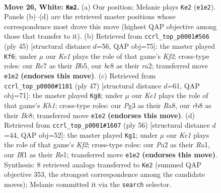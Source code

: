 \documentclass[11pt]{article}
\begin{document}
\clearpage

\begin{figure}[p]\centering
\begin{subfigure}{0.46\textwidth}\centering
\resizebox{\linewidth}{!}{%
\newchessgame
\chessboard[
  setfen={1rb2r2/p1Rp1pk1/8/4p2p/8/5nP1/PP3P1P/2B1KB1R w - - 0 26},
  showmover=false,
  pgfstyle=straightmove, color=movearrow, markmove={e1-e2}
]}
\caption{}
\end{subfigure}\hfill
\begin{subfigure}{0.46\textwidth}\centering
\resizebox{\linewidth}{!}{%
\newchessgame
\chessboard[
  setfen={2r2b1r/5kpp/p3p3/1b2N3/4P3/6P1/RPP1BKP1/7R b - - 0 23},
  showmover=false,
  pgfstyle=straightmove, color=movearrow, markmove={f7-f6}
]}
\caption{}
\end{subfigure}
\\[4pt]
\begin{subfigure}{0.46\textwidth}\centering
\resizebox{\linewidth}{!}{%
\newchessgame
\chessboard[
  setfen={r1b2r1k/5Npp/2p2b2/1p6/p1B5/2P5/PP3PPP/R3R1K1 b - - 7 24},
  showmover=false,
  pgfstyle=straightmove, color=movearrow, markmove={h8-g8}
]}
\caption{}
\end{subfigure}\hfill
\begin{subfigure}{0.46\textwidth}\centering
\resizebox{\linewidth}{!}{%
\newchessgame
\chessboard[
  setfen={5b1r/2N2k2/1p2pp2/2p2r2/8/2P3nP/PP3KP1/R1B1R3 w - - 9 29},
  showmover=false,
  pgfstyle=straightmove, color=movearrow, markmove={f2-g1}
]}
\caption{}
\end{subfigure}
\caption{\textbf{Move 26, White: \texttt{Ke2}.} (a) Our position; Melanie plays \texttt{Ke2} (\texttt{e1e2}). Panels (b)--(d) are the retrieved master positions whose correspondence most drove this move (highest QAP objective among those that transfer to it). (b) Retrieved from \texttt{ccrl\_top\_p0001\#566} (ply 45) [structural distance $d$=56, QAP obj=75]: the master played \texttt{Kf6}; under $\mu$ our \emph{Ke1} plays the role of that game's \emph{Kf2}; cross-type roles: our \emph{R}c7 as their \emph{B}b5, our \emph{b}c8 as their \emph{r}a2; transferred move \texttt{e1e2} \textbf{(endorses this move)}. (c) Retrieved from \texttt{ccrl\_top\_p0000\#1101} (ply 47) [structural distance $d$=61, QAP obj=71]: the master played \texttt{Kg8}; under $\mu$ our \emph{Ke1} plays the role of that game's \emph{Kh1}; cross-type roles: our \emph{P}g3 as their \emph{R}a8, our \emph{r}b8 as their \emph{B}c8; transferred move \texttt{e1e2} \textbf{(endorses this move)}. (d) Retrieved from \texttt{ccrl\_top\_p0001\#1607} (ply 56) [structural distance $d$=44, QAP obj=52]: the master played \texttt{Kg1}; under $\mu$ our \emph{Ke1} plays the role of that game's \emph{Kf2}; cross-type roles: our \emph{P}a2 as their \emph{R}a1, our \emph{B}f1 as their \emph{R}e1; transferred move \texttt{e1e2} \textbf{(endorses this move)}. Synthesis: 8 retrieved analogs transferred to \texttt{Ke2} (summed QAP objective 353, the strongest correspondence among the candidate moves); Melanie committed it via the \texttt{search} selector.}
\label{fig:thought-m50}
\end{figure}
\end{document}
